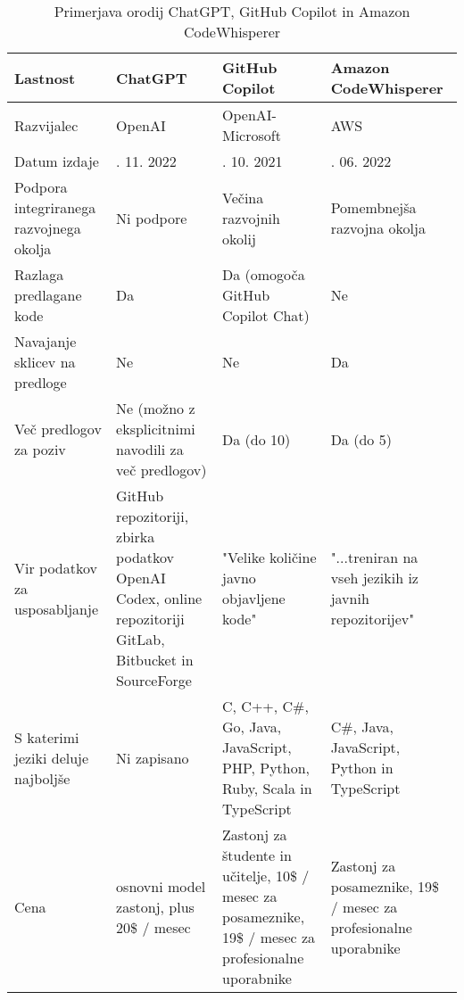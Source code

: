 \documentclass[a4paper,12pt,openright]{book}
\begin{document}
\begin{table}[H]
\centering
\caption{Primerjava orodij ChatGPT, GitHub Copilot in Amazon CodeWhisperer}
\begin{tabular}{|>{\raggedright\arraybackslash}p{3cm}|>{\raggedright\arraybackslash}p{4cm}|>{\raggedright\arraybackslash}p{4cm}|>{\raggedright\arraybackslash}p{4cm}|}
\hline
\textbf{Lastnost}               & \textbf{ChatGPT}           & \textbf{GitHub Copilot}           & \textbf{Amazon CodeWhisperer}          
\\ \hline
Razvijalec              & OpenAI      & OpenAI-Microsoft                  & AWS            \\ \hline
Datum izdaje               & 30. 11. 2022        & 29. 10. 2021           & 23. 06. 2022       \\ \hline
Podpora integriranega razvojnega okolja           & Ni podpore          & Večina razvojnih okolij        & Pomembnejša razvojna okolja          \\ \hline
Razlaga predlagane kode       & Da                       & Da (omogoča GitHub Copilot Chat)                           & Ne                       \\ \hline
Navajanje sklicev na predloge                  & Ne                      & Ne                    & Da                      \\ \hline
Več predlogov za poziv                & Ne (možno z eksplicitnimi navodili za več predlogov)         & Da (do 10)                  & Da (do 5)               \\ \hline
Vir podatkov za usposabljanje             & GitHub repozitoriji, zbirka podatkov OpenAI Codex, online repozitoriji GitLab, Bitbucket in SourceForge                   & "Velike količine javno objavljene kode"                  & "...treniran na vseh jezikih iz javnih repozitorijev"                    \\ \hline
S katerimi jeziki deluje najboljše                        & Ni zapisano                  & C, C++, C\#, Go, Java, JavaScript, PHP, Python, Ruby, Scala in TypeScript              & C\#, Java, JavaScript, Python in TypeScript  \\ \hline
Cena               & osnovni model zastonj, plus 20\$ / mesec          & Zastonj za študente in učitelje, 10\$ / mesec za posameznike, 19\$ / mesec za profesionalne uporabnike                    &   Zastonj za posameznike, 19\$ / mesec za profesionalne uporabnike            \\ \hline
\end{tabular}
\label{tab:comparison}
\end{table}
\end{document}
